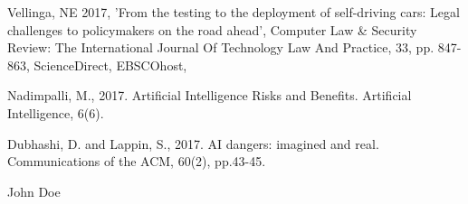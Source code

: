 \documentclass[conference]{IEEEtran}
\begin{document}
\begin{thebibliography}{1}
Vellinga, NE 2017, 'From the testing to the deployment of self-driving cars: Legal challenges to policymakers on the road ahead', Computer Law & Security Review: The International Journal Of Technology Law And Practice, 33, pp. 847-863, ScienceDirect, EBSCOhost, 

Nadimpalli, M., 2017. Artificial Intelligence Risks and Benefits. Artificial Intelligence, 6(6).

Dubhashi, D. and Lappin, S., 2017. AI dangers: imagined and real. Communications of the ACM, 60(2), pp.43-45.
\end{thebibliography}

\begin{IEEEbiography}{John Doe}
\blindtext
\end{IEEEbiography}
\end{document}
